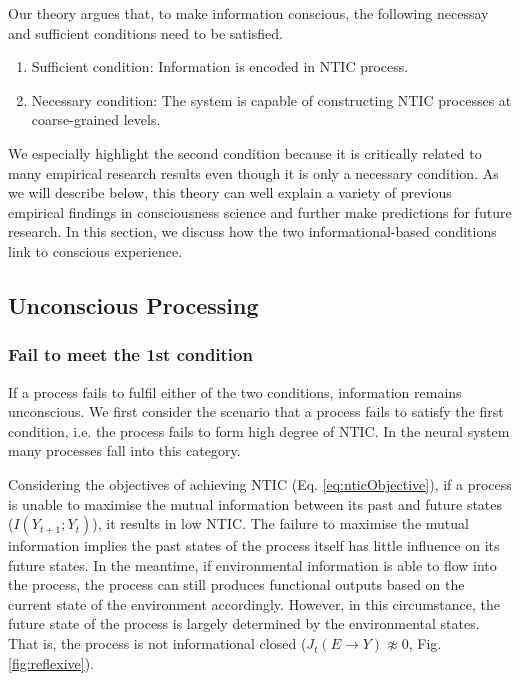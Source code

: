 \documentclass[utf8]{article}
\begin{document}
		Our theory argues that, to make information conscious, the following necessay and sufficient conditions need to be satisfied.
		\begin{enumerate}
		    \item Sufficient condition: Information is encoded in NTIC process. 
		    \item Necessary condition: The system is capable of constructing NTIC processes at coarse-grained levels. 
		\end{enumerate}		
		
        We especially highlight the second condition because it is critically related to many empirical research results even though it is only a necessary condition. As we will describe below, this theory can well explain a variety of previous empirical findings in consciousness science and further make predictions for future research. In this section, we discuss how the two informational-based conditions link to conscious experience. 
		
		
		
        \subsection{Unconscious Processing}
        
        \subsubsection*{Fail to meet the 1\lowercase{st} condition}
            If a process fails to fulfil either of the two conditions, information remains unconscious. We first consider the scenario that a process fails to satisfy the first condition, i.e. the process fails to form high degree of NTIC. In the neural system many processes fall into this category. 
        	
        	Considering the objectives of achieving NTIC (Eq. \ref{eq:nticObjective}), if a process is unable to maximise the mutual information between its past and future states ($I(Y_{t+1};Y_{t})$), it results in low NTIC. The failure to maximise the mutual information implies the past states of the process itself has little influence on its future states. In the meantime, if environmental information is able to flow into the process, the process can still produces functional outputs based on the current state of the environment accordingly. However, in this circumstance, the future state of the process is largely determined by the environmental states. That is, the process is not informational closed (${J_{t}(E \rightarrow Y )} \not\approx 0$, Fig.\ref{fig:reflexive}). 
            	
\end{document}
